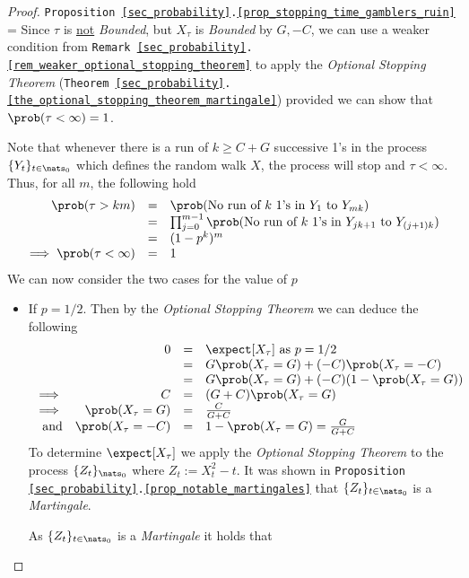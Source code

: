 \documentclass[11pt,a4paper]{article}
\begin{document}
  \begin{proof}{\texttt{Proposition \ref{sec_probability}.\ref{prop_stopping_time_gamblers_ruin}}}
    \everymath={\displaystyle}
    Since $\tau$ is \underline{not} \textit{Bounded}, but $X_\tau$ is \textit{Bounded} by $G,-C$, we can use a weaker condition from \texttt{Remark \ref{sec_probability}.\ref{rem_weaker_optional_stopping_theorem}} to apply the \textit{Optional Stopping Theorem} (\texttt{Theorem \ref{sec_probability}.\ref{the_optional_stopping_theorem_martingale}}) provided we can show that $\prob(\tau<\infty)=1$.
    \par Note that whenever there is a run of $k\geq C+G$ successive 1's in the process $\{Y_t\}_{t\in\nats_0}$ which defines the random walk $X$, the process will stop and $\tau<\infty$. Thus, for all $m$, the following hold
    \[\begin{array}{rcl}
      \prob(\tau>km)&=&\prob(\text{No run of }k\text{ 1's in }Y_1\text{ to }Y_{mk})\\
      &=&\prod_{j=0}^{m-1}\prob(\text{No run of }k\text{ 1's in }Y_{jk+1}\text{ to }Y_{(j+1)k})\\
      &=&(1-p^k)^m\\
      \implies\prob(\tau<\infty)&=&1
    \end{array}\]
    We can now consider the two cases for the value of $p$
    \begin{itemize}
      \item If $p=1/2$. Then by the \textit{Optional Stopping Theorem} we can deduce the following
      \[\begin{array}{rrcl}
        &0&=&\expect[X_\tau]\text{ as }p=1/2\\
        &&=&G\prob(X_\tau=G)+(-C)\prob(X_\tau=-C)\\
        &&=&G\prob(X_\tau=G)+(-C)(1-\prob(X_\tau=G))\\
        \implies&C&=&(G+C)\prob(X_\tau=G)\\
        \implies&\prob(X_\tau=G)&=&\frac{C}{G+C}\\
        \text{and}&\prob(X_\tau=-C)&=&1-\prob(X_\tau=G)=\frac{G}{G+C}
      \end{array}\]
      To determine $\expect[X_\tau]$ we apply the \textit{Optional Stopping Theorem} to the process $\{Z_t\}_{\nats_0}$ where $Z_t:=X_t^2-t$. It was shown in \texttt{Proposition \ref{sec_probability}.\ref{prop_notable_martingales}}  that $\{Z_t\}_{t\in\nats_0}$ is a \textit{Martingale}.
      \par As $\{Z_t\}_{t\in\nats_0}$ is a \textit{Martingale} it holds that

\end{itemize}
\end{proof}
\end{document}
